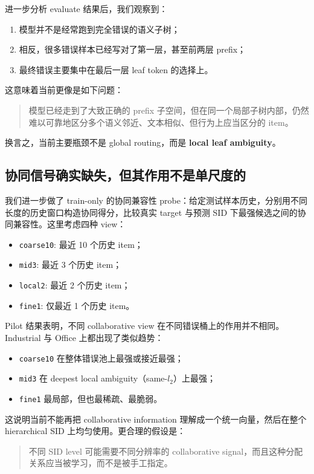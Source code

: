 \documentclass[11pt]{article}
\begin{document}
进一步分析 evaluate 结果后，我们观察到：
\begin{enumerate}
  \item 模型并不是经常跑到完全错误的语义子树；
  \item 相反，很多错误样本已经写对了第一层，甚至前两层 prefix；
  \item 最终错误主要集中在最后一层 leaf token 的选择上。
\end{enumerate}

这意味着当前更像是如下问题：
\begin{quote}
模型已经走到了大致正确的 prefix 子空间，但在同一个局部子树内部，仍然难以可靠地区分多个语义邻近、文本相似、但行为上应当区分的 item。
\end{quote}

换言之，当前主要瓶颈不是 global routing，而是 \textbf{local leaf ambiguity}。

\subsection{协同信号确实缺失，但其作用不是单尺度的}

我们进一步做了 train-only 的协同兼容性 probe：给定测试样本历史，分别用不同长度的历史窗口构造协同得分，比较真实 target 与预测 SID 下最强候选之间的协同兼容性。这里考虑四种 view：
\begin{itemize}
  \item \texttt{coarse10}: 最近 10 个历史 item；
  \item \texttt{mid3}: 最近 3 个历史 item；
  \item \texttt{local2}: 最近 2 个历史 item；
  \item \texttt{fine1}: 仅最近 1 个历史 item。
\end{itemize}

Pilot 结果表明，不同 collaborative view 在不同错误桶上的作用并不相同。Industrial 与 Office 上都出现了类似趋势：
\begin{itemize}
  \item \texttt{coarse10} 在整体错误池上最强或接近最强；
  \item \texttt{mid3} 在 deepest local ambiguity（same-$l_2$）上最强；
  \item \texttt{fine1} 最局部，但也最稀疏、最脆弱。
\end{itemize}

这说明当前不能再把 collaborative information 理解成一个统一向量，然后在整个 hierarchical SID 上均匀使用。更合理的假设是：
\begin{quote}
不同 SID level 可能需要不同分辨率的 collaborative signal，而且这种分配关系应当被学习，而不是被手工指定。
\end{quote}
\end{document}
